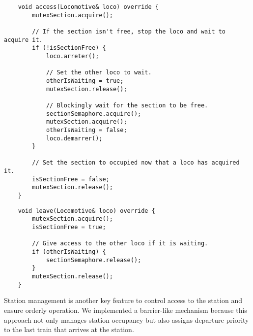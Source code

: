 \documentclass{article}
\begin{document}
    \begin{lstlisting}
    void access(Locomotive& loco) override {
        mutexSection.acquire();

        // If the section isn't free, stop the loco and wait to acquire it.
        if (!isSectionFree) {
            loco.arreter();

            // Set the other loco to wait.
            otherIsWaiting = true;
            mutexSection.release();

            // Blockingly wait for the section to be free.
            sectionSemaphore.acquire();
            mutexSection.acquire();
            otherIsWaiting = false;
            loco.demarrer();
        }

        // Set the section to occupied now that a loco has acquired it.
        isSectionFree = false;
        mutexSection.release();
    }
    \end{lstlisting}

    \begin{lstlisting}
    void leave(Locomotive& loco) override {
        mutexSection.acquire();
        isSectionFree = true;

        // Give access to the other loco if it is waiting.
        if (otherIsWaiting) {
            sectionSemaphore.release();
        }
        mutexSection.release();
    }
    \end{lstlisting}

    \pagebreak

    Station management is another key feature to control access to the station and ensure orderly operation. We implemented a barrier-like mechanism because this approach not only manages station occupancy but also assigns departure priority to the last train that arrives at the station.
\end{document}
